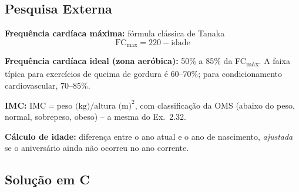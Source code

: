 \documentclass[12pt,a4paper]{article}
\begin{document}
\subsection*{Pesquisa Externa}

\begin{pesquisa}
\textbf{Frequência cardíaca máxima:} fórmula clássica de Tanaka
\[
\text{FC}_{\max} = 220 - \text{idade}
\]

\textbf{Frequência cardíaca ideal (zona aeróbica):} 50\% a 85\% da FC\textsubscript{máx}.
A faixa típica para exercícios de queima de gordura é 60--70\%; para
condicionamento cardiovascular, 70--85\%.

\textbf{IMC:} $\text{IMC} = \text{peso (kg)} / \text{altura (m)}^2$, com classificação
da OMS (abaixo do peso, normal, sobrepeso, obeso) -- a mesma do Ex.~2.32.

\textbf{Cálculo de idade:} diferença entre o ano atual e o ano de nascimento,
\textit{ajustada} se o aniversário ainda não ocorreu no ano corrente.
\end{pesquisa}

\subsection*{Solução em C}
\end{document}

